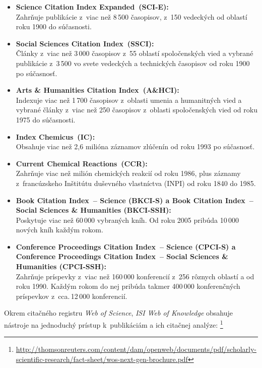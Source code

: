 \begin{itemize}
\item \textbf{Science Citation Index Expanded\R\ (SCI-E):}\\
  Zahrňuje publikácie z~viac než 8\,500 časopisov, z~150
  vedeckých od oblastí roku 1900 do súčasnosti.
\item \textbf{Social Sciences Citation Index\R\ (SSCI):}\\
  Články z~viac než 3\,000 časopisov z~55 oblastí spoločenských vied a vybrané
  publikácie z~3\,500 vo svete vedeckých a technických
  časopisov od roku 1900 po súčasnosť.
\item \textbf{Arts \& Humanities Citation Index\R\ (A\&HCI):}\\
  Indexuje viac než 1\,700 časopisov z~oblasti umenia a humanitných vied a
  vybrané články z~viac než 250 časopisov z~oblasti spoločenských vied od roku 1975
  do súčasnosti.
\item \textbf{Index Chemicus\R\ (IC):}\\
  Obsahuje viac než 2,6 milióna záznamov zlúčenín od roku 1993 po súčasnosť.
\item \textbf{Current Chemical Reactions\R\ (CCR):}\\
  Zahrňuje viac než milión chemických reakcií od roku 1986, plus záznamy
  z~francúzskeho Inštitútu duševného vlastníctva (INPI) od
  roku 1840 do 1985.
\item \textbf{Book Citation Index\R\ -- Science (BKCI-S) a Book Citation
  Index\R\ -- Social Sciences \& Humanities (BKCI-SSH):}\\
  Poskytuje viac než 60\,000 vybraných kníh.  Od roku 2005 pribúda 10\,000 nových kníh
  každým rokom.
\item \textbf{Conference Proceedings Citation Index\R\ -- Science (CPCI-S) a
  Conference Proceedings Citation Index\R\ -- Social Sciences \& Humanities
  (CPCI-SSH):}\\ Zahrňuje príspevky z~viac než 160\,000 konferencií z~256
  rôznych oblastí  a  od roku 1990.  Každým rokom do nej pribúda
  takmer 400\,000 konferenčných príspevkov z~cca.\,12\,000 konferencií.
\end{itemize}


Okrem citačného registru \emph{Web of Science}, \emph{ISI Web of Knowledge}
obsahuje nástroje na jednoduchý prístup k~publikáciám a ich citačnej
analýze: \footnote{\url{http://thomsonreuters.com/content/dam/openweb/documents/pdf/scholarly-scientific-research/fact-sheet/wos-next-gen-brochure.pdf}}


